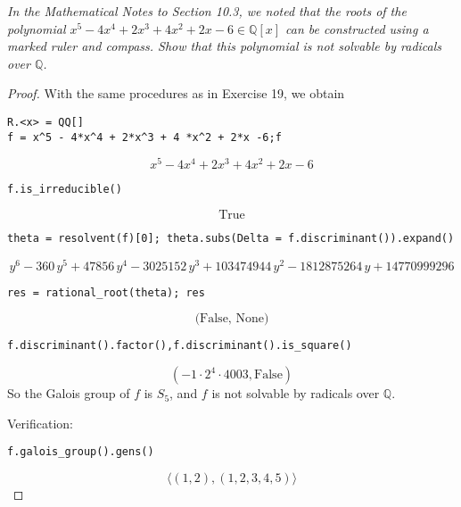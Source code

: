 \documentclass[11pt,a4paper]{article}
\newcommand{\Q}{\mathbb{Q}}
\begin{document}
{\it In the Mathematical Notes to Section 10.3, we noted that the roots of the polynomial $x^5 - 4x^4 + 2x^3 + 4x^2 + 2x - 6 \in \Q[x]$ can be constructed using a marked ruler and compass. Show that this polynomial is not solvable by radicals over $\Q$.
}

\begin{proof}
With the same procedures as in Exercise 19, we obtain
\begin{verbatim}
R.<x> = QQ[]
f = x^5 - 4*x^4 + 2*x^3 + 4 *x^2 + 2*x -6;f
\end{verbatim}
$$x^{5} - 4 x^{4} + 2 x^{3} + 4 x^{2} + 2 x - 6$$

\begin{verbatim}
f.is_irreducible()
\end{verbatim}
$$\text{True}$$

\begin{verbatim}
theta = resolvent(f)[0]; theta.subs(Delta = f.discriminant()).expand()
\end{verbatim}
$$y^{6} - 360 \, y^{5} + 47856 \, y^{4} - 3025152 \, y^{3} + 103474944 \,
y^{2} - 1812875264 \, y + 14770999296
$$
\begin{verbatim}
res = rational_root(theta); res
\end{verbatim}
$$\text{(False, None)}$$
\begin{verbatim}
f.discriminant().factor(),f.discriminant().is_square()
\end{verbatim}
$$(-1 \cdot 2^{4} \cdot 4003, \text{False})$$
So the Galois group of $f$ is $S_5$, and $f$ is not solvable by radicals over $\Q$.

Verification:
\begin{verbatim}
f.galois_group().gens()
\end{verbatim}
$$\langle (1,2), (1,2,3,4,5) \rangle
$$
\end{proof}
\end{document}
